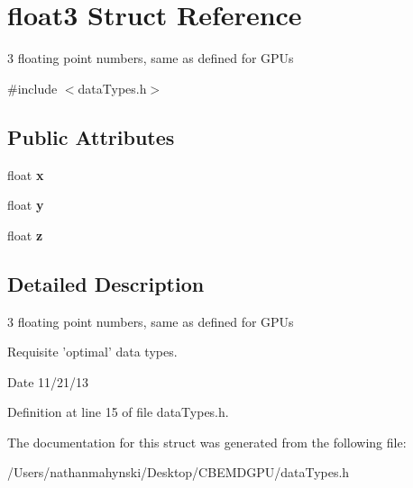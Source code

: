 \hypertarget{structfloat3}{\section{float3 Struct Reference}
\label{structfloat3}
}


3 floating point numbers, same as defined for G\-P\-Us  




{\ttfamily \#include $<$data\-Types.\-h$>$}

\subsection*{Public Attributes}
\begin{DoxyCompactItemize}
\item 
\hypertarget{structfloat3_af621f02abb1c788738fe61ea9807ff9c}{float {\bfseries x}}\label{structfloat3_af621f02abb1c788738fe61ea9807ff9c}

\item 
\hypertarget{structfloat3_aa6147d421a81889971f8c66aa92abf0d}{float {\bfseries y}}\label{structfloat3_aa6147d421a81889971f8c66aa92abf0d}

\item 
\hypertarget{structfloat3_a772dffd42d89f350c5a1b766c4703245}{float {\bfseries z}}\label{structfloat3_a772dffd42d89f350c5a1b766c4703245}

\end{DoxyCompactItemize}


\subsection{Detailed Description}
3 floating point numbers, same as defined for G\-P\-Us 

Requisite 'optimal' data types. \begin{DoxyDate}{Date}
11/21/13 
\end{DoxyDate}


Definition at line 15 of file data\-Types.\-h.



The documentation for this struct was generated from the following file\-:\begin{DoxyCompactItemize}
\item 
/\-Users/nathanmahynski/\-Desktop/\-C\-B\-E\-M\-D\-G\-P\-U/data\-Types.\-h\end{DoxyCompactItemize}

